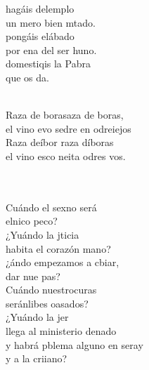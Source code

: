 \documentclass[12pt]{article}
\begin{document}
\begin{multicols*}{2}
\begin{cancion}%
	 hagáis delemplo\\
	un mero bien mtado.\\
	 pongáis elábado\\
	por ena del ser huno.\\
	 domestiqis la Pabra \\
	que os da.\\\jump\\
	\begin{chorus}%
	Raza de borasaza de boras, \\
	el vino evo sedre en odreiejos\\
	Raza deíbor raza díboras\\
	el vino esco neita odres vos.\\
	\end{chorus}%
	\jump\\
	    \\
	Cuándo el sexno será\\
	elnico peco?\\
	¿Yuándo la jticia \\
	habita el corazón mano?\\
	¿ándo empezamos a cbiar,\\
	dar nue pas?\\
\jump
	Cuándo nuestrocuras\\
	seránlibes oasados? \\
	¿Yuándo la jer \\
	llega al ministerio denado\\
	y  habrá pblema alguno en seray\\
	y a la  criiano?\\\jump\\

\end{cancion}
\end{multicols*}
\end{document}
